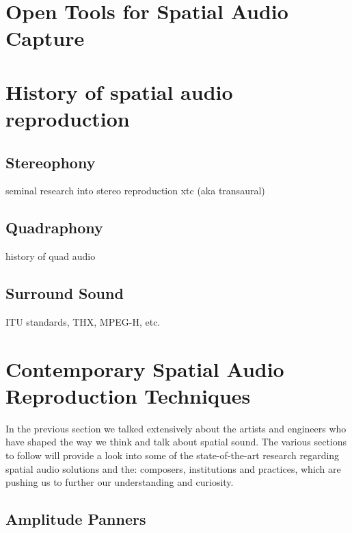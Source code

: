 \section{Open Tools for Spatial Audio Capture}

\section{History of spatial audio reproduction}

\subsection{Stereophony}
seminal research into stereo reproduction
xtc (aka transaural)

\subsection{Quadraphony}
history of quad audio

\subsection{Surround Sound}
ITU standards, THX, MPEG-H, etc.

\section{Contemporary Spatial Audio Reproduction Techniques} \label{sec:contemp_audio_reproduction}

In the previous section we talked extensively about the artists and engineers who have shaped the way we think and talk about spatial sound. The various sections to follow will provide a look into some of the state-of-the-art research regarding spatial audio solutions and the: composers, institutions and practices, which are pushing us to further our understanding and curiosity. 

\subsection{Amplitude Panners}
\label{subsec:amplitude panner}


